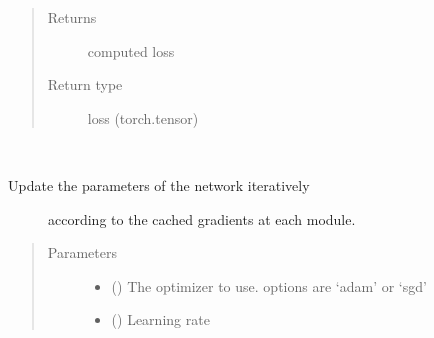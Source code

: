 \documentclass[letterpaper,10pt,english]{sphinxmanual}
\begin{document}
\begin{fulllineitems}
\begin{fulllineitems}
\begin{quote}
\begin{description}
\begin{itemize}
\end{itemize}

\item[{Returns}] \leavevmode
computed loss

\item[{Return type}] \leavevmode
loss (torch.tensor)

\end{description}\end{quote}

\end{fulllineitems}


\begin{fulllineitems}
\label{\detokenize{nn:nn.sequential.Sequential.update_params}}~\begin{description}
\item[{Update the parameters of the network iteratively}] \leavevmode
according to the cached gradients at each module.

\end{description}
\begin{quote}\begin{description}
\item[{Parameters}] \leavevmode\begin{itemize}
\item {} 
 () \textendash{} The optimizer to use. options are ‘adam’ or ‘sgd’

\item {} 
 () \textendash{} Learning rate

\end{itemize}

\end{description}\end{quote}

\end{fulllineitems}



\end{fulllineitems}
\end{document}
